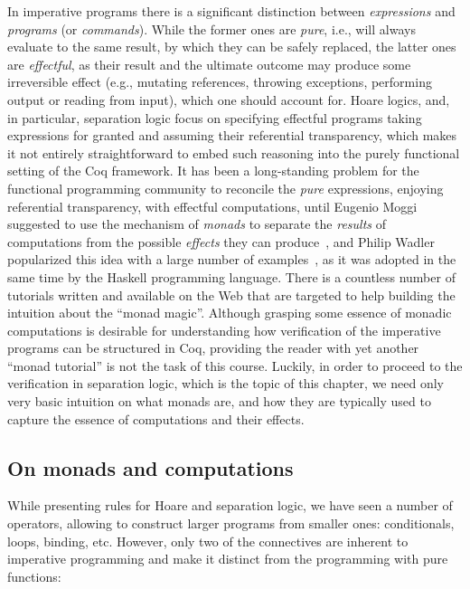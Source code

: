 In imperative programs there is a significant distinction between
\textit{expressions} and \textit{programs} (or \textit{commands}). While the former ones
are \textit{pure}, i.e., will always evaluate to the same result, by which
they can be safely replaced, the latter ones are \textit{effectful}, as their
result and the ultimate outcome may produce some irreversible effect
(e.g., mutating references, throwing exceptions, performing output or
reading from input), which one should account for. Hoare logics, and,
in particular, separation logic focus on specifying effectful programs
taking expressions for granted and assuming their referential
transparency, which makes it not entirely straightforward to embed
such reasoning into the purely functional setting of the Coq
framework.
It has been a long-standing problem for the functional programming
community to reconcile the \textit{pure} expressions, enjoying referential
transparency, with effectful computations, until Eugenio Moggi
suggested to use the mechanism of \textit{monads} to separate the \textit{results}
of computations from the possible \textit{effects} they can
produce~\cite{Moggi:IC91}, and Philip Wadler popularized this idea
with a large number of examples~\cite{Wadler:POPL92}, as it was
adopted in the same time by the Haskell programming language. There is
a countless number of tutorials written and available on the Web that
are targeted to help building the intuition about the ``monad
magic''. Although grasping some essence of monadic computations is
desirable for understanding how verification of the imperative
programs can be structured in Coq, providing the reader with yet
another ``monad tutorial'' is not the task of this course. Luckily, in
order to proceed to the verification in separation logic, which is the
topic of this chapter, we need only very basic intuition on what
monads are, and how they are typically used to capture the essence of
computations and their effects.
\subsection{On monads and computations}


While presenting rules for Hoare and separation logic, we have seen a
number of operators, allowing to construct larger programs from
smaller ones: conditionals, loops, binding, etc. However, only two of
the connectives are inherent to imperative programming and make it
distinct from the programming with pure functions:

